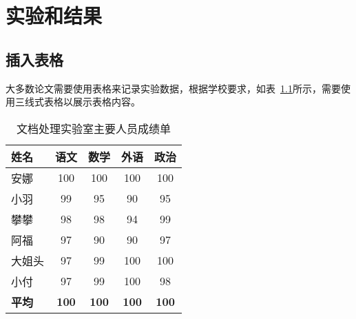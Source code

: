 \chapter{实验和结果}
\section{插入表格}
大多数论文需要使用表格来记录实验数据，根据学校要求，如表~\ref{tab:RTCon}所示，需要使用三线式表格以展示表格内容。
\begin{table}[htb]{
		\centering
		\caption{文档处理实验室主要人员成绩单}
		\label{tab:RTCon}
		\setlength{\tabcolsep}{8mm}
		\begin{tabular}{lcccc}
			\toprule
			姓名 & 语文 & 数学 & 外语 & 政治 \\ 
			\midrule
			安娜 & 100 & 100 & 100 & 100 \\ 
			小羽  & 99 & 95 & 90 & 95 \\ 
			攀攀  & 98  &98 & 94 &99 \\ 
			阿福  & 97& 90 & 90 & 97 \\ 
			大姐头 & 97 &99 & 100 &100 \\ 
			小付 & 97 & 99& 100 & 98\\  
			\midrule
			\textbf{平均} &\textbf{100} & \textbf{100}  & \textbf{100}  & \textbf{100}  \\ 
			\bottomrule
		\end{tabular}\\
	}
\end{table}